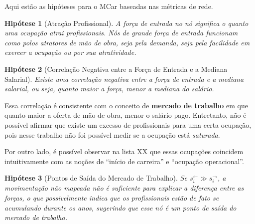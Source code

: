 \documentclass[12pt,a4paper]{article}
\theoremstyle{hypo}
\newtheorem{hypothesis}{Hipótese}
\newcommand{\linkin}[1]{#1^\leftarrow} %
\newcommand{\linkout}[1]{#1^\rightarrow} %
\begin{document}
Aqui estão as hipóteses para o MCar baseadas nas métricas de rede.

\begin{hypothesis}[Atração Profissional]
    A força de entrada no nó significa o quanto uma ocupação atrai profissionais. Nós de grande força de entrada funcionam como polos atratores de mão de obra, seja pela demanda, seja pela facilidade em exercer a ocupação ou por sua atratividade.
\end{hypothesis}


\begin{hypothesis}[Correlação Negativa entre a Força de Entrada e a Mediana Salarial]
    Existe uma correlação negativa entre a força de entrada e a mediana salarial, ou seja, quanto maior a força, menor a mediana do salário.
\end{hypothesis}

Essa correlação é consistente com o conceito de \textbf{mercado de trabalho} em que quanto maior a oferta de mão de obra, menor o salário pago. Entretanto, não é possível afirmar que existe um excesso de profissionais para uma certa ocupação, pois nesse trabalho não foi possível medir se a ocupação está \textit{saturada}. 

Por outro lado, é possível observar na lista XX que essas ocupações coincidem intuitivamente com as noções de \enquote{início de carreira} e \enquote{ocupação operacional}.

\begin{hypothesis}[Pontos de Saída do Mercado de Trabalho]
    Se $\linkin{s}_i \gg \linkout{s}_i$, a movimentação não mapeada não é suficiente para explicar a diferença entre as forças, o que possivelmente indica que os profissionais estão de fato se acumulando durante os anos, sugerindo que esse nó é um ponto de saída do mercado de trabalho.
\end{hypothesis}
\end{document}
